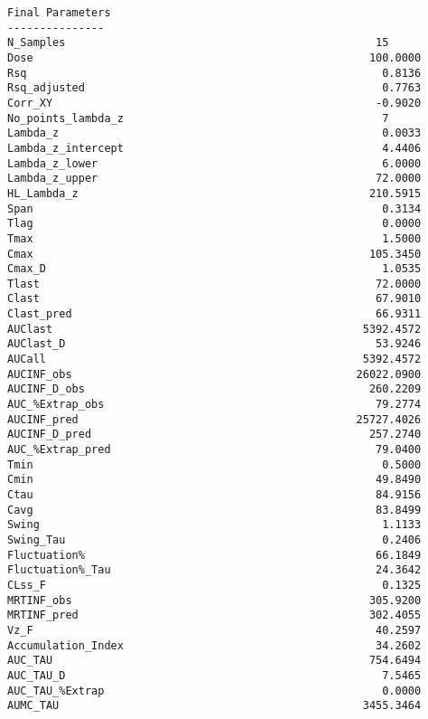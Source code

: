 \documentclass[12pt,a4paper]{article}
\begin{document}
\begin{verbatim}
Final Parameters
---------------
N_Samples                                                15
Dose                                                    100.0000
Rsq                                                       0.8136
Rsq_adjusted                                              0.7763
Corr_XY                                                  -0.9020
No_points_lambda_z                                        7
Lambda_z                                                  0.0033
Lambda_z_intercept                                        4.4406
Lambda_z_lower                                            6.0000
Lambda_z_upper                                           72.0000
HL_Lambda_z                                             210.5915
Span                                                      0.3134
Tlag                                                      0.0000
Tmax                                                      1.5000
Cmax                                                    105.3450
Cmax_D                                                    1.0535
Tlast                                                    72.0000
Clast                                                    67.9010
Clast_pred                                               66.9311
AUClast                                                5392.4572
AUClast_D                                                53.9246
AUCall                                                 5392.4572
AUCINF_obs                                            26022.0900
AUCINF_D_obs                                            260.2209
AUC_%Extrap_obs                                          79.2774
AUCINF_pred                                           25727.4026
AUCINF_D_pred                                           257.2740
AUC_%Extrap_pred                                         79.0400
Tmin                                                      0.5000
Cmin                                                     49.8490
Ctau                                                     84.9156
Cavg                                                     83.8499
Swing                                                     1.1133
Swing_Tau                                                 0.2406
Fluctuation%                                             66.1849
Fluctuation%_Tau                                         24.3642
CLss_F                                                    0.1325
MRTINF_obs                                              305.9200
MRTINF_pred                                             302.4055
Vz_F                                                     40.2597
Accumulation_Index                                       34.2602
AUC_TAU                                                 754.6494
AUC_TAU_D                                                 7.5465
AUC_TAU_%Extrap                                           0.0000
AUMC_TAU                                               3455.3464




\end{verbatim}
\end{document}
